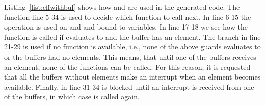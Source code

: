 Listing~\ref{list:cffwithbuf} shows how  and  are used in the generated code. The function  line 5-34 is used to decide which function to call next. In line 6-15 the  operation is used on  and  and bound to variables. In line 17-18 we see how the function  is called if  evaluates to  and the buffer has an element. The  branch in line 21-29 is used if no function is available, i.e., none of the above guards evaluates to  or the buffers had no elements. This means, that until one of the buffers receives an element, none of the functions can be called. For this reason, it is requested that all the buffers without elements make an interrupt when an element becomes available. Finally, in line 31-34  is blocked until an interrupt is received from one of the buffers, in which case  is called again.
